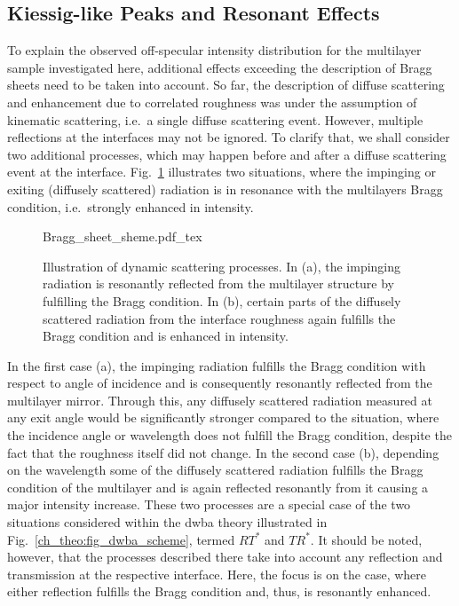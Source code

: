 \subsection{Kiessig-like Peaks and Resonant Effects}
To explain the observed off-specular intensity distribution for the multilayer sample investigated here, additional effects exceeding the description of Bragg sheets need to be taken into account. So far, the description of diffuse scattering and enhancement due to correlated roughness was under the assumption of kinematic scattering, i.e.~a single diffuse scattering event. However, multiple reflections at the interfaces may not be ignored. To clarify that, we shall consider two additional processes, which may happen before and after a diffuse scattering event at the interface. Fig.~\ref{ch_diff:fig_kiessig_like_peaks_scheme} illustrates two situations, where the impinging or exiting (diffusely scattered) radiation is in resonance with the multilayers Bragg condition, i.e.~strongly enhanced in intensity.
\begin{figure}[htb]
    {Bragg_sheet_sheme.pdf_tex}
    \caption[Illustration of dynamic scattering processes.]{Illustration of dynamic scattering processes. In (a), the impinging radiation is resonantly reflected from the multilayer structure by fulfilling the Bragg condition. In (b), certain parts of the diffusely scattered radiation from the interface roughness again fulfills the Bragg condition and is enhanced in intensity.}
    \label{ch_diff:fig_kiessig_like_peaks_scheme}
\end{figure}
In the first case (a), the impinging radiation fulfills the Bragg condition with respect to angle of incidence and is consequently resonantly reflected from the multilayer mirror. Through this, any diffusely scattered radiation measured at any exit angle would be significantly stronger compared to the situation, where the incidence angle or wavelength does not fulfill the Bragg condition, despite the fact that the roughness itself did not change. In the second case (b), depending on the wavelength some of the diffusely scattered radiation fulfills the Bragg condition of the multilayer and is again reflected resonantly from it causing a major intensity increase. These two processes are a special case of the two situations considered within the \gls{dwba} theory illustrated in Fig.~\ref{ch_theo:fig_dwba_scheme}, termed $R T^*$ and $T R^*$. It should be noted, however, that the processes described there take into account any reflection and transmission at the respective interface. Here, the focus is on the case, where either reflection fulfills the Bragg condition and, thus, is resonantly enhanced.

